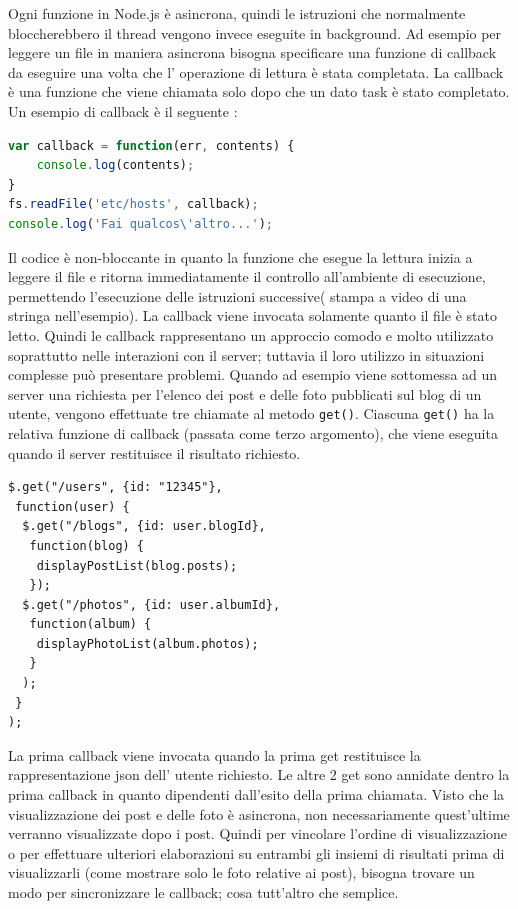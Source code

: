 Ogni funzione in Node.js è asincrona, quindi le istruzioni che normalmente bloccherebbero il thread vengono invece eseguite in background.
Ad esempio per leggere un file in maniera asincrona bisogna specificare una funzione di callback da eseguire una volta che l’ operazione di lettura è stata completata.
La callback è una funzione che viene chiamata solo dopo che un dato task è stato completato.
Un esempio di callback è il seguente :
\begin{lstlisting}[language=javascript]
var callback = function(err, contents) {
	console.log(contents);
}
fs.readFile('etc/hosts', callback);
console.log('Fai qualcos\'altro...');
\end{lstlisting}
Il codice è non-bloccante in quanto la funzione che esegue la lettura inizia a leggere il file e ritorna immediatamente il controllo all’ambiente di esecuzione, permettendo l’esecuzione delle istruzioni successive( stampa a video di una stringa nell’esempio). 
La callback viene invocata solamente quanto il file è stato letto.
Quindi le callback rappresentano un approccio comodo e molto utilizzato soprattutto nelle interazioni con il server; tuttavia il loro utilizzo in situazioni complesse può presentare problemi.
Quando ad esempio viene sottomessa ad un server una richiesta per l’elenco dei post e delle foto pubblicati sul blog di un utente, vengono effettuate tre chiamate al metodo \texttt{get()}. 
Ciascuna \texttt{get()} ha la relativa funzione di callback (passata come terzo argomento), che viene eseguita quando il server restituisce il risultato richiesto.
\begin{lstlisting}
$.get("/users", {id: "12345"},
 function(user) {
  $.get("/blogs", {id: user.blogId},
   function(blog) {
   	displayPostList(blog.posts);
   });
  $.get("/photos", {id: user.albumId},
   function(album) {
   	displayPhotoList(album.photos);
   }
  );	
 }
);
\end{lstlisting}
La prima callback viene invocata quando la prima get restituisce la rappresentazione json dell’ utente richiesto. Le altre 2 get sono annidate dentro la prima callback in quanto dipendenti dall’esito della prima chiamata. 
Visto che la visualizzazione dei post e delle foto è asincrona, non necessariamente quest’ultime verranno visualizzate dopo i post. Quindi per vincolare l’ordine di visualizzazione o per effettuare ulteriori elaborazioni su entrambi gli insiemi di risultati prima di visualizzarli (come mostrare solo le foto relative ai post), bisogna trovare un modo per sincronizzare le callback; cosa tutt’altro che semplice.

